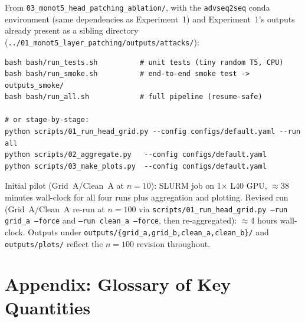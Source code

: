 \documentclass[11pt]{article}
\begin{document}
From \texttt{03\_monot5\_head\_patching\_ablation/}, with the
\texttt{advseq2seq} conda environment (same dependencies as
Experiment~1) and Experiment~1's outputs already present as a sibling
directory (\texttt{../01\_monot5\_layer\_patching/outputs/attacks/}):

\begin{lstlisting}
bash bash/run_tests.sh          # unit tests (tiny random T5, CPU)
bash bash/run_smoke.sh          # end-to-end smoke test -> outputs_smoke/
bash bash/run_all.sh            # full pipeline (resume-safe)

# or stage-by-stage:
python scripts/01_run_head_grid.py --config configs/default.yaml --run all
python scripts/02_aggregate.py   --config configs/default.yaml
python scripts/03_make_plots.py  --config configs/default.yaml
\end{lstlisting}

\noindent Initial pilot (Grid~A/Clean~A at $n=10$): SLURM job on
1$\times$ L40 GPU, $\approx$38 minutes wall-clock for all four runs plus
aggregation and plotting. Revised run (Grid~A/Clean~A re-run at $n=100$
via \texttt{scripts/01\_run\_head\_grid.py --run grid\_a --force} and
\texttt{--run clean\_a --force}, then re-aggregated): $\approx$4 hours
wall-clock. Outputs under
\texttt{outputs/\{grid\_a,grid\_b,clean\_a,clean\_b\}/} and
\texttt{outputs/plots/} reflect the $n=100$ revision throughout.

\section*{Appendix: Glossary of Key Quantities}
\end{document}
